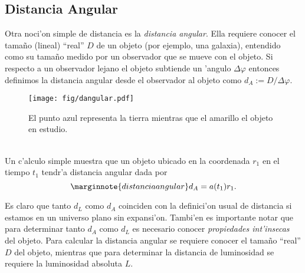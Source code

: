 \subsection{Distancia Angular}
Otra noci'on simple de distancia es la \textit{distancia angular}. Ella requiere conocer el tama\~no (lineal) ``real'' $D$
de un objeto (por ejemplo, una galaxia), entendido como su tama\~no medido por un observador que se mueve con el objeto. 
Si respecto a un observador lejano el objeto subtiende un 'angulo $\Delta\varphi$ entonces definimos la distancia angular
desde el observador al objeto como $d_A:=D/\Delta\varphi$.
\begin{figure}[h]
  \centering
\texttt{[image: fig/dangular.pdf]}
 \caption{El punto azul representa la tierra mientras que el amarillo el objeto en estudio.}
  \end{figure}\\
  Un c'alculo simple muestra que un objeto ubicado en la coordenada
$r_1$ en el tiempo $t_1$ tendr'a distancia angular dada por
\begin{equation}\marginnote{distancia angular}
 d_A=a(t_1)r_1.
\end{equation}

Es claro que tanto $d_L$ como $d_A$ coinciden con la definici'on usual de distancia si estamos en un 
universo plano sin expansi'on. Tambi'en es importante notar que para determinar tanto $d_A$ como $d_L$ es necesario 
conocer \textit{propiedades int'insecas} del objeto. Para calcular la distancia angular se requiere conocer el tama\~no
``real'' $D$ del objeto, mientras que para determinar la distancia de luminosidad se requiere la luminosidad absoluta $L$.


